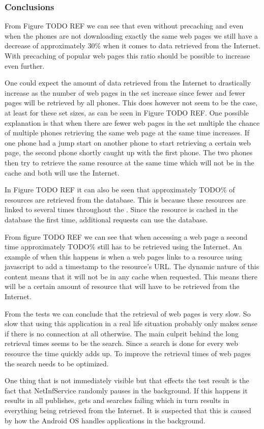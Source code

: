\subsubsection{Conclusions}

From Figure TODO REF we can see that even without precaching and even when the phones are not downloading exactly the same web pages we still have a decrease of approximately 30\% when it comes to data retrieved from the Internet. With precaching of popular web pages this ratio should be possible to increase even further.

One could expect the amount of data retrieved from the Internet to drastically increase as the number of web pages in the set increase since fewer and fewer pages will be retrieved by all phones. This does however not seem to be the case, at least for these set sizes, as can be seen in Figure TODO REF. One possible explanation is that when there are fewer web pages in the set multiple the chance of multiple phones retrieving the same web page at the same time increases. If one phone had a jump start on another phone to start retrieving a certain web page, the second phone shortly caught up with the first phone. The two phones then try to retrieve the same resource at the same time which will not be in the cache and both will use the Internet.

In Figure TODO REF it can also be seen that approximately TODO\% of resources are retrieved from the database. This is because these resources are linked to several times throughout the . Since the resource is cached in the database the first time, additional requests can use the database.

From figure TODO REF we can see that when accessing a web page a second time approximately TODO\% still has to be retrieved using the Internet. An example of when this happens is when a web pages links to a resource using javascript to add a timestamp to the resource's URL. The dynamic nature of this content means that it will not be in any cache when requested. This means there will be a certain amount of resource that will have to be retrieved from the Internet.

From the tests we can conclude that the retrieval of web pages is very slow. So slow that using this application in a real life situation probably only makes sense if there is no connection at all otherwise. The main culprit behind the long retrieval times seems to be the search. Since a search is done for every web resource the time quickly adds up. To improve the retrieval times of web pages the search needs to be optimized.

One thing that is not immediately visible but that effects the test result is the fact that NetInfService randomly pauses in the background. If this happens it results in all publishes, gets and searches failing which in turn results in everything being retrieved from the Internet. It is suspected that this is caused by how the Android OS handles applications in the background.